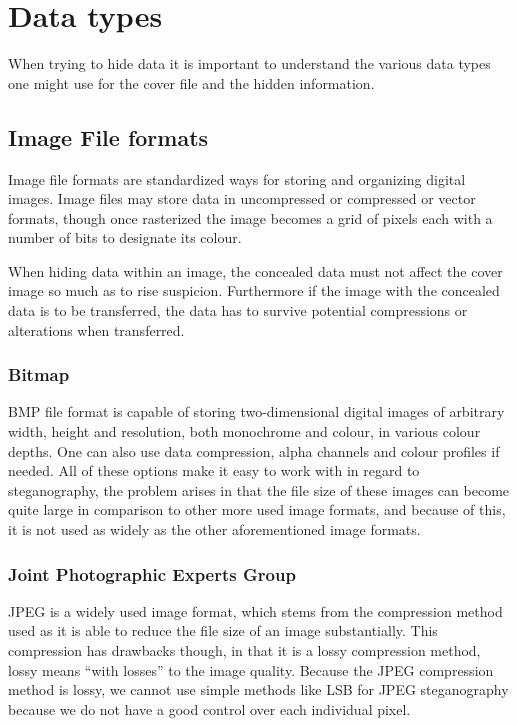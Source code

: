 \section{Data types}
When trying to hide data it is important to understand the various data types one might use for the cover file and the hidden information.

\subsection{Image File formats}
Image file formats are standardized ways for storing and organizing digital images.
Image files may store data in uncompressed or compressed or vector formats, though once rasterized the image becomes a grid of pixels each with a number of bits to designate its colour.


When hiding data within an image, the concealed data must not affect the cover image so much as to rise suspicion.
Furthermore if the image with the concealed data is to be transferred, the data has to survive potential compressions or alterations when transferred.

\subsubsection*{Bitmap}
BMP file format is capable of storing two-dimensional digital images of arbitrary width, height and resolution, both monochrome and colour, in various colour depths. 
One can also use data compression, alpha channels and colour profiles if needed.
All of these options make it easy to work with in regard to steganography, the problem arises in that the file size of these images can become quite large in comparison to other more used image formats, and because of this, it is not used as widely as the other aforementioned image formats.

\subsubsection*{Joint Photographic Experts Group}
JPEG is a widely used image format, which stems from the compression method used as it is able to reduce the file size of an image substantially.
This compression has drawbacks though, in that it is a lossy compression method, lossy means ``with losses'' to the image quality.
Because the JPEG compression method is lossy, we cannot use simple methods like LSB for JPEG steganography because we do not have a good control over each individual pixel.


